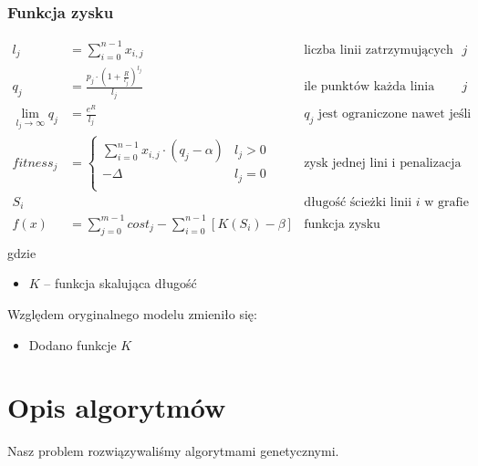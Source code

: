 \documentclass[12pt,a4paper,openright]{mwrep}
\begin{document}
\subsection{Funkcja zysku}
\begin{align*}
    l_j                         & = \sum_{i=0}^{n-1} x_{i, j}                                               & \text{liczba linii zatrzymujących się na przystanku $j$}                 \\
    q_j                         & = \frac{p_j \cdot (1+\frac{R}{l_j})^{l_j}}{l_j}                           & \text{ile punktów każda linia uzyskuje z przystanku $j$}                 \\
    \lim_{l_{j}\to\infty} q_{j} & =  \frac{e^R}{l_j}                                                        & \text{$q_{j}$ jest ograniczone nawet jeśli liczba lini jest bardzo duża} \\
    fitness_{j}                    & = \begin{cases}
        \sum_{i=0}^{n-1} x_{i,j} \cdot (q_j-\alpha) & l_j > 0 \\
        -\Delta                                     & l_j = 0 \\
    \end{cases}                                               & \text{zysk jednej lini  i penalizacja nieodwiedzonych przystanków}                           \\
    S_{i}                       &                                                                           & \text{długość ścieżki linii $i$ w grafie}                                \\
    f(x)                        & = \sum_{j=0}^{m-1} cost_{j} - \sum_{i=0}^{n-1} \left[ K(S_{i})-\beta \right] & \text{funkcja zysku}                                                    \\
\end{align*}
gdzie
\begin{itemize}
	\item $K$ -- funkcja skalująca długość
\end{itemize}
Względem oryginalnego modelu zmieniło się:
\begin{itemize}
	\item Dodano funkcje $K$
\end{itemize}







\chapter{Opis algorytmów}
Nasz problem rozwiązywaliśmy algorytmami genetycznymi.
\end{document}
